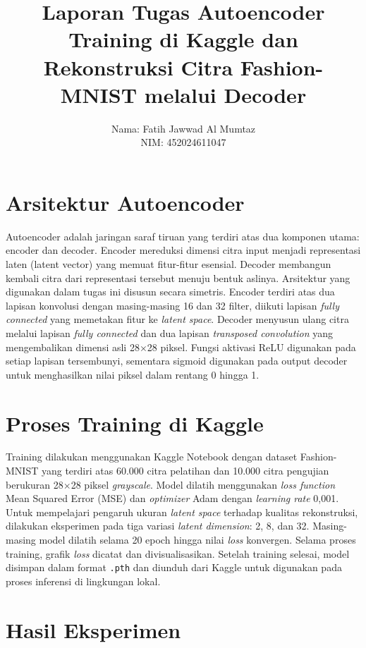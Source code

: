 \documentclass[12pt,a4paper]{article}
\title{\textbf{Laporan Tugas Autoencoder}\\[4pt]
\large Training di Kaggle dan Rekonstruksi Citra Fashion-MNIST melalui Decoder}
\author{Nama: Fatih Jawwad Al Mumtaz \\ NIM: 452024611047}
\date{}
\begin{document}
\maketitle
\thispagestyle{empty}
\vspace{-20pt}

\section{Arsitektur Autoencoder}

Autoencoder adalah jaringan saraf tiruan yang terdiri atas dua komponen utama: encoder dan decoder. Encoder mereduksi dimensi citra input menjadi representasi laten (latent vector) yang memuat fitur-fitur esensial. Decoder membangun kembali citra dari representasi tersebut menuju bentuk aslinya. Arsitektur yang digunakan dalam tugas ini disusun secara simetris. Encoder terdiri atas dua lapisan konvolusi dengan masing-masing 16 dan 32 filter, diikuti lapisan \textit{fully connected} yang memetakan fitur ke \textit{latent space}. Decoder menyusun ulang citra melalui lapisan \textit{fully connected} dan dua lapisan \textit{transposed convolution} yang mengembalikan dimensi asli 28$\times$28 piksel. Fungsi aktivasi ReLU digunakan pada setiap lapisan tersembunyi, sementara sigmoid digunakan pada output decoder untuk menghasilkan nilai piksel dalam rentang 0 hingga 1.

\section{Proses Training di Kaggle}

Training dilakukan menggunakan Kaggle Notebook dengan dataset Fashion-MNIST yang terdiri atas 60.000 citra pelatihan dan 10.000 citra pengujian berukuran 28$\times$28 piksel \textit{grayscale}. Model dilatih menggunakan \textit{loss function} Mean Squared Error (MSE) dan \textit{optimizer} Adam dengan \textit{learning rate} 0,001. Untuk mempelajari pengaruh ukuran \textit{latent space} terhadap kualitas rekonstruksi, dilakukan eksperimen pada tiga variasi \textit{latent dimension}: 2, 8, dan 32. Masing-masing model dilatih selama 20 epoch hingga nilai \textit{loss} konvergen. Selama proses training, grafik \textit{loss} dicatat dan divisualisasikan. Setelah training selesai, model disimpan dalam format \texttt{.pth} dan diunduh dari Kaggle untuk digunakan pada proses inferensi di lingkungan lokal.

\section{Hasil Eksperimen}
\end{document}
